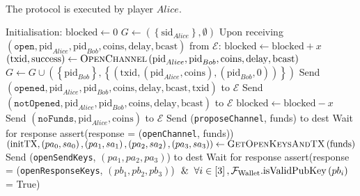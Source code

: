 \ \\  The protocol is executed by player $Alice$.
  \label{alg:lightningprot}
  \begin{algorithmic}[1]
    \State Initialisation:
    \Indent
      \State $\mathrm{blocked} \leftarrow 0$
      \State $G \leftarrow \left(\left\{\mathrm{sid}_{Alice}\right\}, \emptyset\right)$
    \EndIndent
    \State
    \State Upon receiving $\left(\mathtt{open}, \mathrm{pid}_{Alice}, \mathrm{pid}_{Bob},
    \mathrm{coins}, \mathrm{delay}, \mathrm{bcast}\right)$ from $\mathcal{E}$:
    \Indent
        \State $\mathrm{blocked} \leftarrow \mathrm{blocked} + x$
        \State $\left(\mathrm{txid}, \mathrm{success}\right) \gets
        \textsc{OpenChannel}\left(\mathrm{pid}_{Alice}, \mathrm{pid}_{Bob},
        \mathrm{coins}, \mathrm{delay}, \mathrm{bcast}\right)$
          \State $G \leftarrow G \cup \left(\left\{\mathrm{pid}_{Bob}\right\},
          \left\{\left(\mathrm{txid}, \left(\mathrm{pid}_{Alice}, \mathrm{coins}\right),
          \left(\mathrm{pid}_{Bob}, 0\right)\right)\right\}\right)$
          \State Send $\left(\mathtt{opened}, \mathrm{pid}_{Alice}, \mathrm{pid}_{Bob},
          \mathrm{coins}, \mathrm{delay}, \mathrm{bcast}, \mathrm{txid}\right)$ to
          $\mathcal{E}$
        \Else
          \State Send $\left(\mathtt{notOpened}, \mathrm{pid}_{Alice}, \mathrm{pid}_{Bob},
          \mathrm{coins}, \mathrm{delay}, \mathrm{bcast}\right)$ to $\mathcal{E}$
        \EndIf
        \State $\mathrm{blocked} \leftarrow \mathrm{blocked} - x$
      \Else
        \State Send $\left(\mathtt{noFunds}, \mathrm{pid}_{Alice}, \mathrm{coins}\right)$
        to $\mathcal{E}$
      \EndIf
    \EndIndent
    \State
      \State Send (\texttt{proposeChannel}, funds) to dest
      \State Wait for response
      \State assert(response = (\texttt{openChannel}, funds))
      \State $\left(\mathrm{initTX}, \left(pa_0, sa_0\right), \left(pa_1, sa_1\right),
      \left(pa_2, sa_2\right), \left(pa_3, sa_3\right)\right) \gets
      \textsc{GetOpenKeysAndTX}\left(\mathrm{funds}\right)$
      \State Send (\texttt{openSendKeys}, $\left(pa_1, pa_2, pa_3\right)$) to dest
      \State Wait for response
      \State assert(response = (\texttt{openResponseKeys}, $\left(pb_1, pb_2,
      pb_3\right)$)
      \Indent
        \State $\And \forall i \in \left[3\right],
        \mathcal{F}_{\mathrm{Wallet}}.\mathrm{isValidPubKey}\left(pb_i\right)$ = True)

\end{algorithmic}
